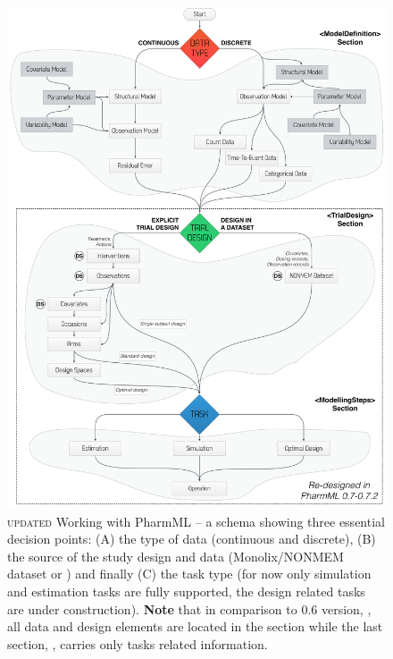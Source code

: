\newpage
\begin{figure}[htb!]
\centering
  \includegraphics[width=166mm]{pics/Flowchart072}
 \caption{{\color{red} \scshape{updated}} Working with PharmML -- a schema 
 showing three essential decision points: (A) the type of data (continuous and discrete), 
 (B) the source of the study design and data (Monolix/NONMEM dataset or ) 
 and finally (C) the task type (for now only simulation and estimation tasks are fully 
 supported, the design related tasks are under construction). \textbf{Note} that in 
 comparison to 0.6 version, \cite{Pharmml_06}, all data and design elements are located 
 in the  section while the last section, , 
 carries only tasks related information.}
 \label{fig:Flowchart07}
\end{figure}

\newpage

